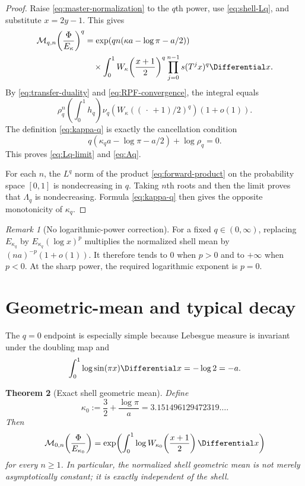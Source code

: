 \documentclass[11pt,oneside]{article}
\newtheorem{theorem}{Theorem}[section]
\theoremstyle{definition}
\theoremstyle{remark}
\newtheorem{remark}[theorem]{Remark}
\newcommand{\Phiup}{\Phi}
\begin{document}
\begin{proof}
Raise \eqref{eq:master-normalization} to the $q$th power, use
\eqref{eq:shell-Lq}, and substitute $x=2y-1$.  This gives
\begin{align*}
 \mathcal M_{q,n}\!\left(\frac{\Phiup}{E_\kappa}\right)^q
 &=\exp\!\left(qn(\kappa a-\log\pi-a/2)\right)\\
 &\quad\times\int_0^1
 W_\kappa\!\left(\frac{x+1}{2}\right)^q
 \prod_{j=0}^{n-1}s(T^jx)^q\Differential x.
\end{align*}
By \eqref{eq:transfer-duality} and \eqref{eq:RPF-convergence}, the integral equals
\[
 \rho_q^n\left(\int_0^1h_q\right)
 \nu_q\!\left(W_\kappa((\,\cdot\,+1)/2)^q\right)(1+o(1)).
\]
The definition \eqref{eq:kappa-q} is exactly the cancellation condition
\[
 q(\kappa_q a-\log\pi-a/2)+\log\rho_q=0.
\]
This proves \eqref{eq:Lq-limit} and \eqref{eq:Aq}.

For each $n$, the $L^q$ norm of the product \eqref{eq:forward-product} on the probability
space $[0,1]$ is nondecreasing in $q$.  Taking $n$th roots and then the limit proves that
$\Lambda_q$ is nondecreasing.  Formula \eqref{eq:kappa-q} then gives the opposite
monotonicity of $\kappa_q$.
\end{proof}

\begin{remark}[No logarithmic-power correction]
\label{rem:no-log-correction}
For a fixed $q\in(0,\infty)$, replacing $E_{\kappa_q}$ by
$E_{\kappa_q}(\log x)^p$ multiplies the normalized shell mean by
$(na)^{-p}(1+o(1))$.  It therefore tends to $0$ when $p>0$ and to $+\infty$ when $p<0$.
At the sharp power, the required logarithmic exponent is $p=0$.
\end{remark}

\section{Geometric-mean and typical decay}
\label{sec:typical}

The $q=0$ endpoint is especially simple because Lebesgue measure is invariant under the
doubling map and
\begin{equation}
 \int_0^1\log\sin(\pi x)\Differential x=-\log2=-a.
 \label{eq:log-sine-integral}
\end{equation}

\begin{theorem}[Exact shell geometric mean]
\label{thm:geometric-mean}
Define
\begin{equation}
 \kappa_0:=\frac32+\frac{\log\pi}{a}
 =3.151496129472319\ldots .
 \label{eq:kappa0}
\end{equation}
Then
\begin{equation}
 \mathcal M_{0,n}\!\left(\frac{\Phiup}{E_{\kappa_0}}\right)
 =\exp\!\left(\int_0^1
    \log W_{\kappa_0}\!\left(\frac{x+1}{2}\right)\Differential x\right)
 \label{eq:exact-geometric-mean}
\end{equation}
for every $n\ge1$.  In particular, the normalized shell geometric mean is not merely
asymptotically constant; it is exactly independent of the shell.
\end{theorem}
\end{document}
